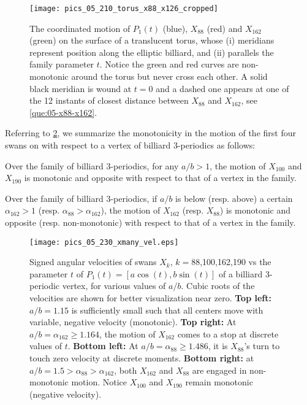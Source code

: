 \begin{figure}
    \centering
    \texttt{[image: pics\_05\_210\_torus\_x88\_x126\_cropped]}
    \caption{The coordinated motion of $P_1(t)$ (blue), $X_{88}$ (red) and $X_{162}$ (green) on the surface of a translucent torus, whose (i) meridians represent position along the elliptic billiard, and (ii) parallels the family parameter $t$. Notice the green and red curves are non-monotonic around the torus but never cross each other. A solid black meridian is wound at $t=0$ and a dashed one appears at one of the 12 instants of closest distance between $X_{88}$ and $X_{162}$, see \cref{que:05-x88-x162}.}
    \label{fig:05-3d-torus}
\end{figure}

Referring to \cref{fig:05-x190-angular-velocity}, we summarize the monotonicity in the motion of the first four swans on \cite{etc} with respect to a vertex of billiard 3-periodics as follows:

\begin{proposition}
\label{prop:05-x100-x190}
Over the family of billiard 3-periodics, for any $a/b>1$, the motion of $X_{100}$ and $X_{190}$ is monotonic and opposite with respect to that of a vertex in the family.
\end{proposition}

\begin{proposition}
\label{prop:05-x88-x162}
Over the family of billiard 3-periodics, if $a/b$ is below (resp. above) a certain $\alpha_{162}>1$ (resp. $\alpha_{88}>\alpha_{162}$), the motion of $X_{162}$ (resp. $X_{88}$) is monotonic and opposite (resp. non-monotonic) with respect to that of a vertex in the family. 
\end{proposition}

\begin{figure}
    \centering
    \texttt{[image: pics\_05\_230\_xmany\_vel.eps]}
    \caption{Signed angular velocities of swans $X_k$, $k=$88,100,162,190 vs the parameter $t$ of $P_1(t)=[a\cos(t),b\sin(t)]$ of a billiard 3-periodic vertex, for various values of $a/b$. Cubic roots of the velocities are shown for better visualization near zero. \textbf{Top left:} $a/b=1.15$ is sufficiently small such that all centers move with variable, negative velocity (monotonic). \textbf{Top right:} At $a/b=\alpha_{162}{\geq}1.164$, the motion of $X_{162}$ comes to a stop at discrete values of $t$. \textbf{Bottom left:} At $a/b=\alpha_{88}{\geq}1.486$, it is $X_{88}$'s turn to touch zero velocity at discrete moments. \textbf{Bottom right:} at $a/b=1.5>\alpha_{88}>\alpha_{162}$, both $X_{162}$ and $X_{88}$ are engaged in non-monotonic motion. Notice $X_{100}$ and $X_{190}$ remain monotonic (negative velocity).}
    \label{fig:05-x190-angular-velocity}
\end{figure}
